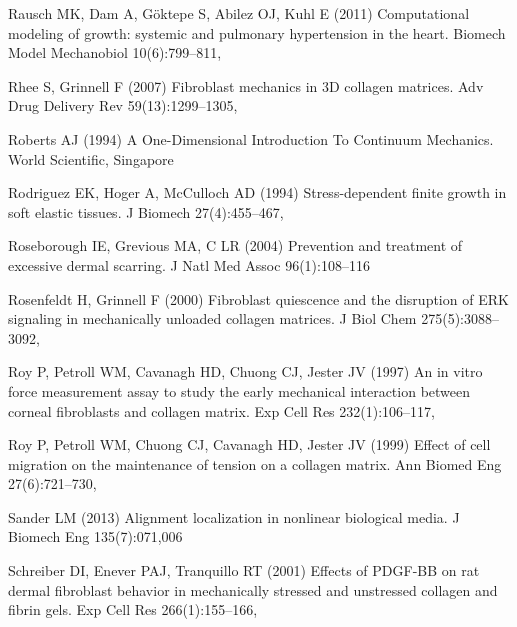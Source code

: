 \begin{thebibliography}{124}
Rausch MK, Dam A, G{\"o}ktepe S, Abilez OJ, Kuhl E (2011) Computational
  modeling of growth: systemic and pulmonary hypertension in the heart. Biomech
  Model Mechanobiol 10(6):799--811, 

Rhee S, Grinnell F (2007) Fibroblast mechanics in {3D} collagen matrices. Adv
  Drug Delivery Rev 59(13):1299--1305, 

Roberts AJ (1994) A One-Dimensional Introduction To Continuum Mechanics. World
  Scientific, Singapore

Rodriguez EK, Hoger A, McCulloch AD (1994) Stress-dependent finite growth in
  soft elastic tissues. J Biomech 27(4):455--467,

Roseborough IE, Grevious MA, C LR (2004) Prevention and treatment of excessive
  dermal scarring. J Natl Med Assoc 96(1):108--116

Rosenfeldt H, Grinnell F (2000) Fibroblast quiescence and the disruption of
  {ERK} signaling in mechanically unloaded collagen matrices. J Biol Chem
  275(5):3088--3092, 

Roy P, Petroll WM, Cavanagh HD, Chuong CJ, Jester JV (1997) An in vitro force
  measurement assay to study the early mechanical interaction between corneal
  fibroblasts and collagen matrix. Exp Cell Res 232(1):106--117,

Roy P, Petroll WM, Chuong CJ, Cavanagh HD, Jester JV (1999) Effect of cell
  migration on the maintenance of tension on a collagen matrix. Ann Biomed Eng
  27(6):721--730, 

Sander LM (2013) Alignment localization in nonlinear biological media. J
  Biomech Eng 135(7):071,006

Schreiber DI, Enever PAJ, Tranquillo RT (2001) Effects of {PDGF-BB} on rat
  dermal fibroblast behavior in mechanically stressed and unstressed collagen
  and fibrin gels. Exp Cell Res 266(1):155--166, 


\end{thebibliography}
